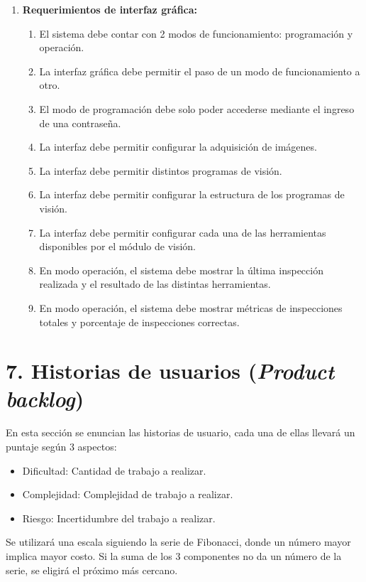 \documentclass[
11pt, %
codirector, %
]{charter}
\begin{document}
\begin{enumerate}
	\item \textbf{Requerimientos de interfaz gráfica:}
	\begin{enumerate}
		\item El sistema debe contar con 2 modos de funcionamiento: programación y operación. \REQ
		\item La interfaz gráfica debe permitir el paso de un modo de funcionamiento a otro. \REQ
		\item El modo de programación debe solo poder accederse mediante el ingreso de una contraseña. \REQ
		\item La interfaz debe permitir configurar la adquisición de imágenes. \REQ
		\item La interfaz debe permitir distintos programas de visión. \REQ
		\item La interfaz debe permitir configurar la estructura de los programas de visión. \REQ
		\item La interfaz debe permitir configurar cada una de las herramientas disponibles por el módulo de visión. \REQ
		\item En modo operación, el sistema debe mostrar la última inspección realizada y el resultado de las distintas herramientas. \REQ
		\item En modo operación, el sistema debe mostrar métricas de inspecciones totales y porcentaje de inspecciones correctas. \REQ
	\end{enumerate}
	
\end{enumerate}


\section{7. Historias de usuarios (\textit{Product backlog})}
\label{sec:backlog}

En esta sección se enuncian las historias de usuario, cada una de ellas llevará un puntaje según 3 aspectos:

\begin{itemize}

	\item Dificultad: Cantidad de trabajo a realizar.
	\item Complejidad: Complejidad de trabajo a realizar.
	\item Riesgo: Incertidumbre del trabajo a realizar.

\end{itemize}

Se utilizará una escala siguiendo la serie de Fibonacci, donde un número mayor implica mayor costo. Si la suma de los 3 componentes no da un número de la serie, se eligirá el próximo más cercano.
\end{document}
